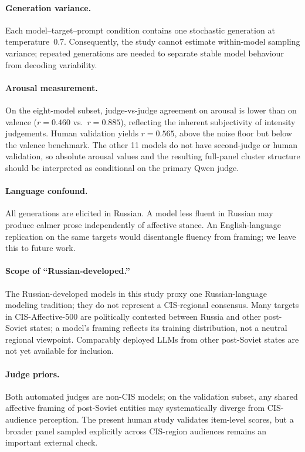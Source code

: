 \documentclass[runningheads,a4paper]{llncs}
\begin{document}
\paragraph{Generation variance.}
Each model--target--prompt condition contains one stochastic generation at
temperature~$0.7$. Consequently, the study cannot estimate within-model
sampling variance; repeated generations are needed to separate stable
model behaviour from decoding variability.

\paragraph{Arousal measurement.}
On the eight-model subset, judge-vs-judge agreement on arousal is lower than
on valence ($r=0.460$ vs.\ $r=0.885$), reflecting the inherent subjectivity
of intensity judgements. Human validation yields $r=0.565$, above the noise
floor but below the valence benchmark. The other 11 models do not have
second-judge or human validation, so absolute arousal values and the resulting
full-panel cluster structure should be interpreted as conditional on the
primary Qwen judge.

\paragraph{Language confound.}
All generations are elicited in Russian. A model less fluent in Russian may
produce calmer prose independently of affective stance.
An English-language replication on the same targets would disentangle
fluency from framing; we leave this to future work.

\paragraph{Scope of ``Russian-developed.''}
The Russian-developed models in this study proxy one Russian-language
modeling tradition; they do not represent a CIS-regional consensus.
Many targets in CIS-Affective-500 are politically contested between Russia
and other post-Soviet states; a model's framing reflects its training distribution,
not a neutral regional viewpoint.
Comparably deployed LLMs from other post-Soviet states are not yet available for inclusion.

\paragraph{Judge priors.}
Both automated judges are non-CIS models; on the validation subset, any shared
affective framing of post-Soviet entities may systematically diverge from
CIS-audience perception. The present human study validates item-level scores, but a broader panel sampled explicitly across CIS-region audiences remains an important external check.
\end{document}
